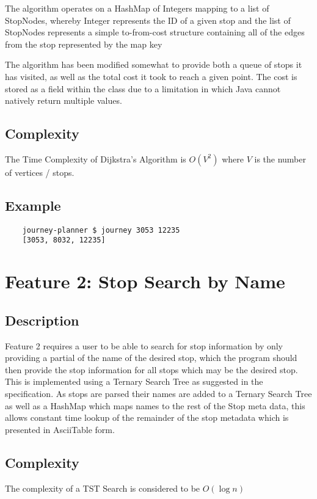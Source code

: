 \documentclass[12pt]{report}
\begin{document}
	The algorithm operates on a HashMap of Integers mapping to a list of StopNodes, whereby Integer represents the ID of a given stop and the list of StopNodes represents a simple to-from-cost structure containing all of the edges from the stop represented by the map key \newline 
	
	The algorithm has been modified somewhat to provide both a queue of stops it has visited, as well as the total cost it took to reach a given point. The cost is stored as a field within the class due to a limitation in which Java cannot natively return multiple values. \newline
	
	\subsection{Complexity}
	The Time Complexity of Dijkstra's Algorithm is $O(V^2)$ where $V$ is the number of vertices / stops.
	
	\subsection{Example}
	\begin{verbatim}
	journey-planner $ journey 3053 12235
	[3053, 8032, 12235]
	\end{verbatim}
	
	\section{Feature 2: Stop Search by Name} \label{ft2}
	\subsection{Description}
	Feature 2 requires a user to be able to search for stop information by only providing a partial of the name of the desired stop, which the program should then provide the stop information for all stops which may be the desired stop. This is implemented using a Ternary Search Tree as suggested in the specification. As stops are parsed their names are added to a Ternary Search Tree as well as a HashMap which maps names to the rest of the Stop meta data, this allows constant time lookup of the remainder of the stop metadata which is presented in AsciiTable form.  
	
	
	\subsection{Complexity}
	The complexity of a TST Search is considered to be $O(\log n)$
\end{document}
